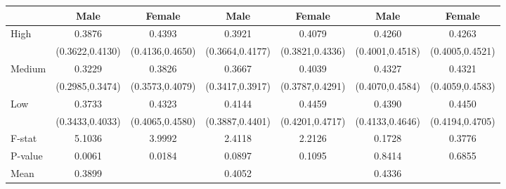 \begin{tabular}{lcccccc}
\hline  & Male & Female & Male & Female & Male & Female\\
\hline High & 0.3876 & 0.4393 & 0.3921 & 0.4079 & 0.4260 & 0.4263\\
 & (0.3622,0.4130) & (0.4136,0.4650) & (0.3664,0.4177) & (0.3821,0.4336) & (0.4001,0.4518) & (0.4005,0.4521)\\
Medium & 0.3229 & 0.3826 & 0.3667 & 0.4039 & 0.4327 & 0.4321\\
 & (0.2985,0.3474) & (0.3573,0.4079) & (0.3417,0.3917) & (0.3787,0.4291) & (0.4070,0.4584) & (0.4059,0.4583)\\
Low & 0.3733 & 0.4323 & 0.4144 & 0.4459 & 0.4390 & 0.4450\\
 & (0.3433,0.4033) & (0.4065,0.4580) & (0.3887,0.4401) & (0.4201,0.4717) & (0.4133,0.4646) & (0.4194,0.4705)\\
F-stat & 5.1036 & 3.9992 & 2.4118 & 2.2126 & 0.1728 & 0.3776\\
P-value & 0.0061 & 0.0184 & 0.0897 & 0.1095 & 0.8414 & 0.6855\\
Mean & 0.3899 &  & 0.4052 &  & 0.4336 & \\
\hline\end{tabular}\\
\hfil\\
